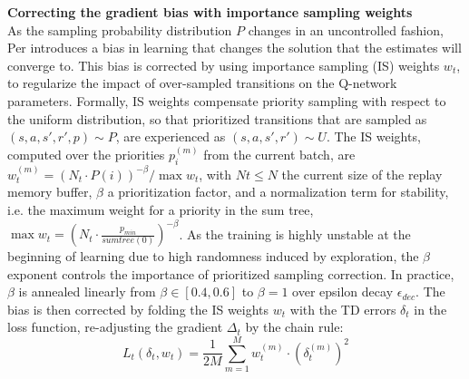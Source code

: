 \textbf{Correcting the gradient bias with importance sampling weights} \\
As the sampling probability distribution $P$ changes in an uncontrolled fashion, Per introduces a bias in learning that changes the solution that the estimates will converge to. This bias is corrected by using importance sampling (IS) weights $w_t$, to regularize the impact of over-sampled transitions on the Q-network parameters. Formally, IS weights compensate priority sampling with respect to the uniform distribution, so that prioritized transitions that are sampled as $(s,a,s',r',p) \sim P$, are experienced as $(s,a,s',r') \sim U$. The IS weights, computed over the priorities $p_i^{(m)}$ from the current batch, are $w_{t}^{(m)} = (N_t \cdot P(i))^{-\beta} / \max w_{t}$, with $Nt \leq N$ the current size of the replay memory buffer, $\beta$ a prioritization factor, and a normalization term for stability, i.e. the maximum weight for a priority in the sum tree, $\max w_{t} = (N_t \cdot \frac{p_{min}}{sum tree (0)})^{-\beta}$. As the training is highly unstable at the beginning of learning due to high randomness induced by exploration, the $\beta$ exponent controls the importance of prioritized sampling correction. In practice, $\beta$ is annealed linearly from $\beta \in [0.4,0.6]$ to $\beta=1$ over epsilon decay $\epsilon_{dec}$. The bias is then corrected by folding the IS weights $w_t$ with the TD errors $\delta_t$ in the loss function, re-adjusting the gradient $\Delta_t$ by the chain rule:
\[ L_t(\delta_t,w_t) = \frac{1}{2M}\sum_{m=1}^M w_{t}^{(m)} \cdot (\delta_t^{(m)})^2 \]

